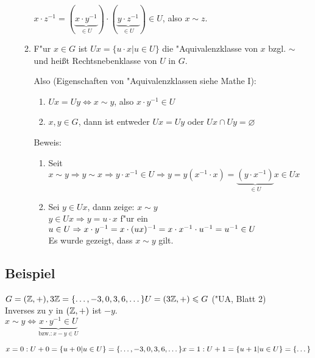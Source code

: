 \begin{enumerate}
\begin{enumerate}
		$x \cdot z^{-1} = (\underbrace{x \cdot y^{-1}}_{\in U}) \cdot (\underbrace{y \cdot z^{-1}}_{\in U}) \in U$, also $x \sim z$.
		
		\item
		F"ur $x \in G$ ist $Ux = \{u \cdot x | u \in U\}$ die "Aquivalenzklasse von $x$ bzgl. $\sim$ und heißt Rechtsnebenklasse von $U$ in $G$.
		
		Also (Eigenschaften von "Aquivalenzklassen siehe Mathe I):
		\begin{enumerate}
			\item
			$Ux = Uy \Leftrightarrow x \sim y$, also $x \cdot y^{-1} \in U$
			\item
			$x,y \in G$, dann ist entweder $Ux = Uy$ oder $Ux \cap Uy = \varnothing $
		\end{enumerate}
		
		Beweis:
		\begin{enumerate}
			\item
			Seit $x \sim y \Rightarrow y \sim x \Rightarrow y \cdot x^{-1} \in U \Rightarrow y=y(x^{-1} \cdot x) = \underbrace{(y \cdot x^{-1})}_{\in U}x \in Ux$
			\item
			Sei $y \in Ux$, dann zeige: $x \sim y$ \\
			$y \in Ux \Rightarrow y = u \cdot x$ f"ur ein $u \in U\\
			\Rightarrow x \cdot y^{-1} = x \cdot (ux)^{-1} = x \cdot x^{-1} \cdot u^{-1} = u^{-1} \in U$\\
			Es wurde gezeigt, dass $x \sim y$ gilt.
		\end{enumerate}
	\end{enumerate}
\end{enumerate}

\subsection{Beispiel}

$G = (\mathbb{Z}, +), 3 \mathbb{Z} = \{\dots, -3,0,3,6,\dots\}\\
U = (3 \mathbb{Z}, +) \leqslant G$ ("UA, Blatt 2)\\
Inverses zu y in $(\mathbb{Z},+)$ ist $-y$.\\
$x \sim y \Leftrightarrow \underbrace{x \cdot y ^{-1} \in U}_{\text{bzw.:}\, x-y \in U}$ 

$ x=0 : U+0 = \{u+0 | u \in U\}= \{\dots, -3,0,3,6,\dots\}\\
   x=1 : U+1 = \{u+1 | u \in U\} = \{\dots\}$